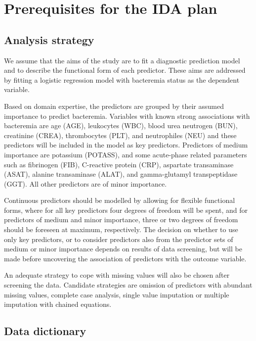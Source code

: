 \documentclass[
  letterpaper,
  DIV=11,
  numbers=noendperiod]{scrreport}
\begin{document}
\hypertarget{prerequisites-for-the-ida-plan}{%
\section{Prerequisites for the IDA
plan}\label{prerequisites-for-the-ida-plan}}

\hypertarget{analysis-strategy}{%
\subsection{Analysis strategy}\label{analysis-strategy}}

We assume that the aims of the study are to fit a diagnostic prediction
model and to describe the functional form of each predictor. These aims
are addressed by fitting a logistic regression model with bacteremia
status as the dependent variable.

Based on domain expertise, the predictors are grouped by their assumed
importance to predict bacteremia. Variables with known strong
associations with bacteremia are age (AGE), leukocytes (WBC), blood urea
neutrogen (BUN), creatinine (CREA), thrombocytes (PLT), and neutrophiles
(NEU) and these predictors will be included in the model as key
predictors. Predictors of medium importance are potassium (POTASS), and
some acute-phase related parameters such as fibrinogen (FIB), C-reactive
protein (CRP), aspartate transaminase (ASAT), alanine transaminase
(ALAT), and gamma-glutamyl transpeptidase (GGT). All other predictors
are of minor importance.

Continuous predictors should be modelled by allowing for flexible
functional forms, where for all key predictors four degrees of freedom
will be spent, and for predictors of medium and minor importance, three
or two degrees of freedom should be foreseen at maximum, respectively.
The decision on whether to use only key predictors, or to consider
predictors also from the predictor sets of medium or minor importance
depends on results of data screening, but will be made before uncovering
the association of predictors with the outcome variable.

An adequate strategy to cope with missing values will also be chosen
after screening the data. Candidate strategies are omission of
predictors with abundant missing values, complete case analysis, single
value imputation or multiple imputation with chained equations.

\hypertarget{data-dictionary}{%
\subsection{Data dictionary}\label{data-dictionary}}
\end{document}
